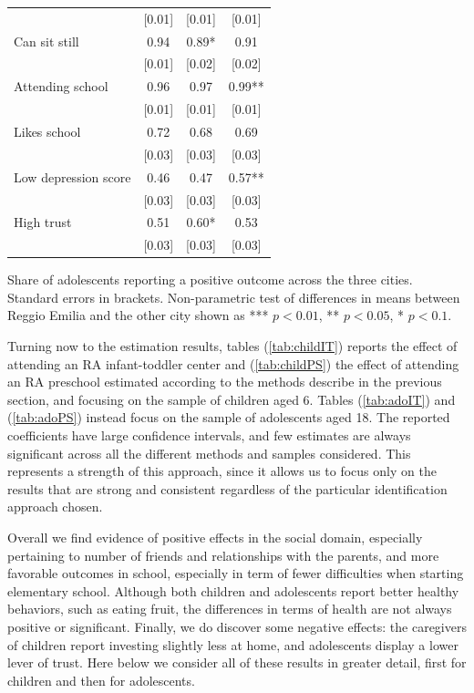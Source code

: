 \documentclass[12pt]{article}
\begin{document}
\begin{table}[ht]
\begin{center}
\begin{tabular}{lccc}
          & [0.01] & [0.01] & [0.01] \\
    Can sit still & 0.94  & 0.89* & 0.91 \\
          & [0.01] & [0.02] & [0.02] \\
    Attending school & 0.96  & 0.97  & 0.99** \\
          & [0.01] & [0.01] & [0.01] \\
    Likes school & 0.72  & 0.68  & 0.69 \\
          & [0.03] & [0.03] & [0.03] \\
    Low depression score & 0.46  & 0.47  & 0.57** \\
          & [0.03] & [0.03] & [0.03] \\
    High trust & 0.51  & 0.60* & 0.53 \\
          & [0.03] & [0.03] & [0.03] \\

    \hline	
    \end{tabular}
\end{center}

\begin{footnotesize}
\raggedright{Share of adolescents reporting a positive outcome across the three cities. Standard errors in brackets.
Non-parametric test of differences in means between Reggio Emilia and the other city shown as *** $p<0.01$, ** $p<0.05$, * $p<0.1$.}
\end{footnotesize}
\end{table}

Turning now to the estimation results, tables (\ref{tab:childIT}) reports the effect of attending an RA infant-toddler center and (\ref{tab:childPS}) the effect of attending an RA preschool estimated according to the methods describe in the previous section, and focusing on the sample of children aged 6. Tables (\ref{tab:adoIT}) and (\ref{tab:adoPS}) instead focus on the sample of adolescents aged 18.
The reported coefficients have large confidence intervals, and few estimates are always significant across all the different methods and samples considered. This represents a strength of this approach, since it allows us to focus only on the results that are strong and consistent regardless of the particular identification approach chosen.

Overall we find evidence of positive effects in the social domain, especially pertaining to number of friends and relationships with the parents, and more favorable outcomes in school, especially in term of fewer difficulties when starting elementary school. Although both children and adolescents report better healthy behaviors, such as eating fruit, the differences in terms of health are not always positive or significant. Finally, we do discover some negative effects: the caregivers of children report investing slightly less at home, and adolescents display a lower lever of trust. Here below we consider all of these results in greater detail, first for children and then for adolescents.
\end{document}
